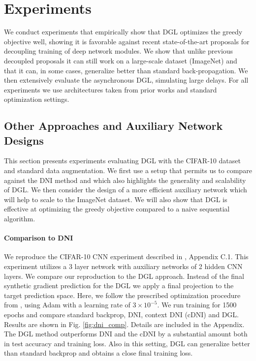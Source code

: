 \documentclass{article}
\begin{document}
\section{Experiments}
We conduct experiments that empirically show that DGL optimizes the greedy objective well, showing it is favorable against recent state-of-the-art proposals for decoupling training of deep network modules. We show that unlike previous decoupled proposals it can still work on a large-scale dataset (ImageNet) and that it can, in some cases, generalize better than standard back-propagation. We then extensively evaluate the asynchronous DGL, simulating large delays. For all experiments we use architectures taken from prior works and standard optimization settings. 
\vspace{-3pt}
\subsection{Other Approaches and Auxiliary Network Designs}\label{sec:comparisons}
This section presents experiments evaluating DGL with the CIFAR-10 dataset~\citep{krizhevsky2009learning} and standard data augmentation. We  first use a  setup that permits us to compare against the DNI method and which also highlights the generality and scalability of DGL.  We then consider the design of a more efficient auxiliary network which will help to scale to the ImageNet dataset. We will also show that DGL is  effective at optimizing the greedy objective compared to a naive sequential algorithm.
\paragraph{Comparison to DNI}
We reproduce the CIFAR-10 CNN experiment described in \citep{jaderberg2016decoupled}, Appendix C.1. This experiment utilizes a 3 layer network with auxiliary networks of 2 hidden CNN layers.  We compare our reproduction to the DGL approach. Instead of the final synthetic gradient prediction for the DGL we apply a final projection to the target prediction space. Here, we follow the prescribed optimization procedure from \citep{jaderberg2016decoupled}, using Adam with a learning rate of $3\times 10^{-5}$. We run training for 1500 epochs and compare standard backprop, DNI, context DNI (cDNI) \citep{jaderberg2016decoupled} and DGL.  Results are shown in Fig. \ref{fig:dni_comp}. Details are included in the Appendix. The DGL method outperforms DNI and the cDNI by a substantial amount both in test accuracy and training loss. Also in this setting, DGL can generalize better than standard backprop and obtains a close final training loss.
\end{document}
